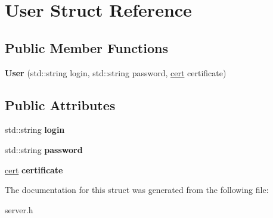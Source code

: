 \hypertarget{struct_user}{\section{User Struct Reference}
\label{struct_user}
}
\subsection*{Public Member Functions}
\begin{DoxyCompactItemize}
\item 
\hypertarget{struct_user_ab04cc458ae6fdb2dc3fee53f9c8da87d}{{\bfseries User} (std\-::string login, std\-::string password, \hyperlink{structcert}{cert} certificate)}\label{struct_user_ab04cc458ae6fdb2dc3fee53f9c8da87d}

\end{DoxyCompactItemize}
\subsection*{Public Attributes}
\begin{DoxyCompactItemize}
\item 
\hypertarget{struct_user_a68ef4336327a1ee8b4532a6042485f3a}{std\-::string {\bfseries login}}\label{struct_user_a68ef4336327a1ee8b4532a6042485f3a}

\item 
\hypertarget{struct_user_ac2f2e75b15e8eb6cbb030fc85a6cd59f}{std\-::string {\bfseries password}}\label{struct_user_ac2f2e75b15e8eb6cbb030fc85a6cd59f}

\item 
\hypertarget{struct_user_aab47f7d62a202b4147a69a6d182668ac}{\hyperlink{structcert}{cert} {\bfseries certificate}}\label{struct_user_aab47f7d62a202b4147a69a6d182668ac}

\end{DoxyCompactItemize}


The documentation for this struct was generated from the following file\-:\begin{DoxyCompactItemize}
\item 
server.\-h\end{DoxyCompactItemize}
